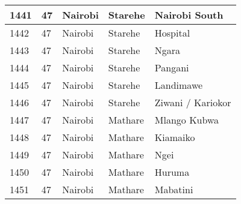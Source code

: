 \begin{table}[!ht]
\begin{tabular}{|l|l|l|l|l|}
        1441 & 47 & Nairobi & Starehe & Nairobi South \\ \hline
        1442 & 47 & Nairobi & Starehe & Hospital \\ \hline
        1443 & 47 & Nairobi & Starehe & Ngara \\ \hline
        1444 & 47 & Nairobi & Starehe & Pangani \\ \hline
        1445 & 47 & Nairobi & Starehe & Landimawe \\ \hline
        1446 & 47 & Nairobi & Starehe & Ziwani / Kariokor \\ \hline
        1447 & 47 & Nairobi & Mathare & Mlango Kubwa \\ \hline
        1448 & 47 & Nairobi & Mathare & Kiamaiko \\ \hline
        1449 & 47 & Nairobi & Mathare & Ngei \\ \hline
        1450 & 47 & Nairobi & Mathare & Huruma \\ \hline
        1451 & 47 & Nairobi & Mathare & Mabatini \\ \hline
    \end{tabular}
\end{table}